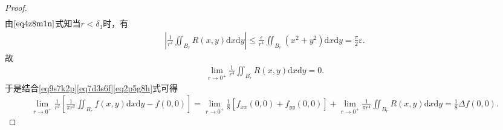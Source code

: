 \documentclass[../../main.tex]{subfiles}%
\begin{document}
\begin{proof}
\begin{align}
\end{align}
由$\eqref{eq4z8m1n}$式知当$r<\delta_1$时，有
\begin{align*}
\left| \frac{1}{r^4}\iint_{B_r} R(x,y)\mathrm{d}x\mathrm{d}y \right| \leqslant \frac{\varepsilon}{r^4}\iint_{B_r} (x^2+y^2)\mathrm{d}x\mathrm{d}y=\frac{\pi}{2}\varepsilon.
\end{align*}
故
\begin{align}
\lim\limits_{r\to 0^+} \frac{1}{r^4}\iint_{B_r} R(x,y)\mathrm{d}x\mathrm{d}y=0. \label{eq2p5g8h}
\end{align}
于是结合\eqref{eq9s7k2p}\eqref{eq7d3s6f}\eqref{eq2p5g8h}式可得
\begin{align*}
\lim\limits_{r\to 0^+} \frac{1}{r^2}\left[ \frac{1}{\pi r^2}\iint_{B_r} f(x,y)\mathrm{d}x\mathrm{d}y - f(0,0) \right] = \lim\limits_{r\to 0^+} \frac{1}{8}\left[ f_{xx}(0,0) + f_{yy}(0,0) \right] + \lim\limits_{r\to 0^+}\frac{1}{\pi r^4}\iint_{B_r}R(x,y)\mathrm{d}x\mathrm{d}y 
= \frac{1}{8}\Delta f(0,0).
\end{align*}
\end{proof}
\end{document}
